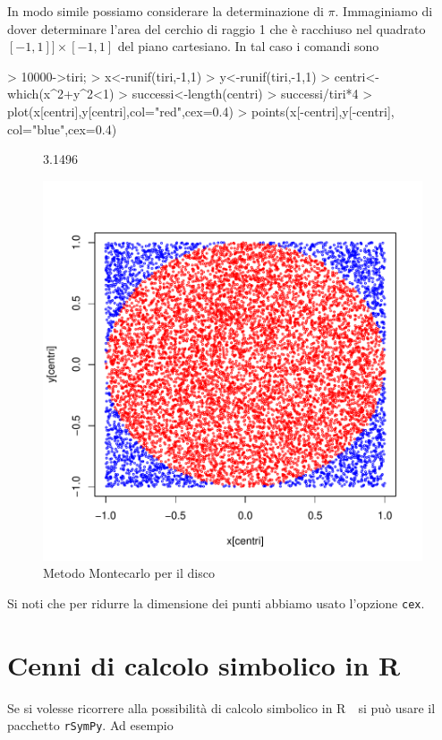\documentclass[onecolumn,11pt]{book}
\newcommand{\rpr}{\textsf{R}~}
\begin{document}
In modo simile possiamo considerare la determinazione di $\pi$. Immaginiamo di dover determinare l'area del cerchio di raggio 1 che \`e racchiuso nel quadrato $[-1,1]]\times[-1,1]$ del piano cartesiano.
In tal caso i comandi sono
\begin{Schunk}
\begin{Sinput}
> 10000->tiri;
> x<-runif(tiri,-1,1)
> y<-runif(tiri,-1,1)
> centri<-which(x^2+y^2<1)
> successi<-length(centri)
> successi/tiri*4
> plot(x[centri],y[centri],col="red",cex=0.4)
> points(x[-centri],y[-centri], col="blue",cex=0.4)
\end{Sinput}
\end{Schunk}

\begin{figure}[htbp]
\begin{center}
\begin{Schunk}
\begin{Soutput}
[1] 3.1496
\end{Soutput}
\end{Schunk}
\includegraphics{RbookParte1-161}
\caption{Metodo Montecarlo per il disco}
\label{fig:montecarlo}
\end{center}
\end{figure}
 Si noti che per ridurre la dimensione dei punti abbiamo usato l'opzione \texttt{cex}.
\section{Cenni di calcolo simbolico in \rpr}
Se si volesse ricorrere alla possibilit\`a di calcolo simbolico in \rpr\ si pu\`o usare il pacchetto \texttt{rSymPy}. Ad esempio
\end{document}
